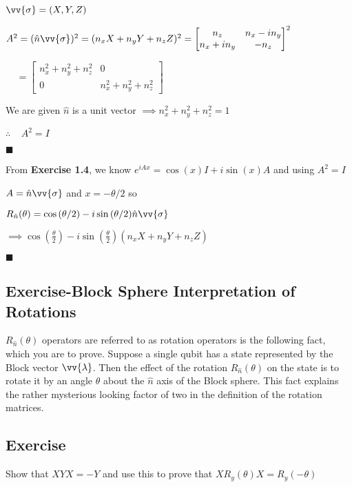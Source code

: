 \documentclass{article}
\begin{document}
$\vv{\sigma} = (X, Y, Z)$

$
  A^{2} = (\hat{n}\vv{\sigma})^{2} = (n_{x}X + n_{y}Y + n_{z}Z)^{2} = 
  \begin{bmatrix}
    n_z & n_x - in_y \\
    n_x + in_y & -n_z
  \end{bmatrix}^{2}
$

$
\mspace{20mu} = \begin{bmatrix}
    n_{x}^{2} + n_{y}^{2} + n_{z}^{2} & 0 \\
    0 & n_{x}^{2} + n_{y}^{2} + n_{z}^{2}
  \end{bmatrix}
$

We are given $\hat{n}$ is a unit vector $\implies n_{x}^{2} + n_{y}^{2} + n_{z}^{2} = 1$

$\therefore \mspace{20mu} A^{2} = I$

$\blacksquare$

From \textbf{Exercise 1.4}, we know $e^{iAx} = \cos{(x)}I + i\sin{(x)A}$ and
using $A^{2} = I$

$A = \hat{n}\vv{\sigma}$ and $x = -\theta / 2$ so

$R_{\hat{n}}(\theta) = \cos{(\theta/2)} - i\sin{(\theta/2)}\hat{n}\vv{\sigma}$

$\implies \cos{(\frac{\theta}{2})} - i\sin{(\frac{\theta}{2})}(n_xX + n_yY + n_zZ)$


$\blacksquare$
\subsection{Exercise-Block Sphere Interpretation of Rotations}
$R_{\hat{n}}(\theta)$ operators are referred to as rotation operators is the
following fact, which you are to prove. Suppose a single qubit has a state
represented by the Block vector $\vv{\lambda}$. Then the effect
of the rotation $R_{\hat{n}}(\theta)$ on the state is to rotate it by an
angle $\theta$ about the $\hat{n}$ axis of the Block sphere. This fact
explains the rather mysterious looking factor of two in the definition
of the rotation matrices.


\subsection{Exercise}
Show that $XYX = -Y$ and use this to prove that $XR_{y}(\theta)X = R_{y}(-\theta)$
\end{document}
